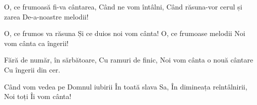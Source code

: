 \beginverse
O, ce frumoasă fi-va cântarea,
Când ne vom întâlni,
Când răsuna-vor cerul și zarea
De-a-noastre melodii!
\endverse

\beginchorus
O, ce frumos va răsuna
Și ce duios noi vom cânta!
O, ce frumoase melodii
Noi vom cânta ca îngerii!
\endchorus

\beginverse
Fără de număr, în sărbătoare,
Cu ramuri de finic,
Noi vom cânta o nouă cântare
Cu îngerii din cer.
\endverse

\beginverse
Când vom vedea pe Domnul iubirii
În toată slava Sa,
În dimineața reîntâlnirii,
Noi toți Îi vom cânta!
\endverse
\endsong